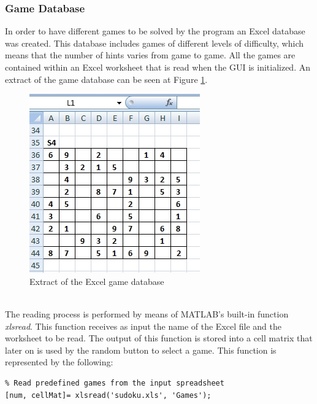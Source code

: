 \documentclass[12pt,a4paper]{article} %
\begin{document}
\subsubsection{Game Database}
In order to have different games to be solved by the program an Excel database was created. This database includes games of different levels of difficulty, which means that the number of hints varies from game to game. All the games are contained within an Excel worksheet that is read when the GUI is initialized. An extract of the game database can be seen at Figure \ref{fig:excel}.
\begin{figure}[h!]
\centering
\includegraphics[scale = 0.6]{pictures/Excel1}
\caption{Extract of the Excel game database}
\label{fig:excel}
\end{figure}
\newline
\\The reading process is performed by means of MATLAB’s built-in function \textit{xlsread}. This function receives as input the name of the Excel file and the worksheet to be read. The output of this function is stored into a cell matrix that later on is used by the random button to select a game. This function is represented by the following:
\begin{verbatim}
% Read predefined games from the input spreadsheet
[num, cellMat]= xlsread('sudoku.xls', 'Games');
\end{verbatim}
\end{document}
